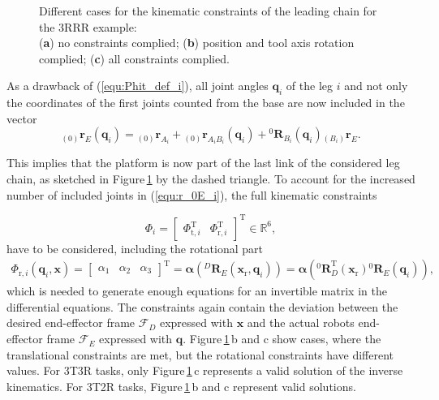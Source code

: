 \documentclass[robotics,article,accept,moreauthors,pdftex]{Definitions/mdpi}
\newcommand{\bm}[1]{\boldsymbol{#1}}
\newcommand{\ortvek}[4]{{ }_{(#1)}{\boldsymbol{#2}}^{#3}_{#4} }
\newcommand{\rotmat}[2]{{{ }^{#1}\boldsymbol{R}}_{#2}}
\newcommand{\transp}[0]{{\mathrm{T}}}
\newcommand{\ks}[1]{{\mathcal{F}}_{#1}}
\let\Phi\varPhi
\begin{document}
\begin{figure}[H]
	
	\caption{Different cases for the kinematic constraints of the leading chain for the 3RRR example:\\(\textbf{a}) no constraints complied; (\textbf{b}) position and tool axis rotation complied; (\textbf{c}) all constraints complied.}
	\label{fig:pkm_constr_rot_lead}
\end{figure} 

As a drawback of (\ref{equ:Phit_def_i}), all joint angles $\bm{q}_i$ of the leg $i$ and not only the coordinates of the first joints counted from the base are now included in the vector
%
\begin{equation}
\ortvek{0}{r}{}{E}(\bm{q}_i) = 
\ortvek{0}{r}{}{A_i}
+ \ortvek{0}{r}{}{A_iB_i}(\bm{q}_i) + \rotmat{0}{B_i}(\bm{q}_i) \ortvek{B_i}{r}{}{E}.
\label{equ:r_0E_i}
\end{equation}
%

This implies that the platform is now part of the last link of the considered leg chain, as sketched in Figure\,\ref{fig:pkm_constr_rot_lead} by the dashed triangle.
To account for the increased number of included joints in (\ref{equ:r_0E_i}), the full kinematic constraints
\vspace{-0.2cm} %

\begin{equation}
\bm{\Phi}_i=\begin{bmatrix}
\bm{\Phi}_{\mathrm{t},i}^\transp & \bm{\Phi}_{\mathrm{r},i}^\transp
\end{bmatrix}^\transp \in {\mathbb{R}}^{6},
\label{equ:Phi_def}
\end{equation}
%
have to be considered, including the rotational part
%
\begin{align}
\bm{\Phi}_{\mathrm{r},i}(\bm{q}_i,\bm{x})
=
\begin{bmatrix}
\alpha_1 & \alpha_2 & \alpha_3
\end{bmatrix}^\transp
=
\bm{\alpha}\left(\rotmat{D}{E}(\bm{x}_{\mathrm{r}},\bm{q}_i)\right)
=
\bm{\alpha}\left(\rotmat{0}{D}^\transp (\bm{x}_{\mathrm{r}})\rotmat{0}{E}(\bm{q}_i)\right),
\label{equ:Phir_def_i}
\end{align}
%
which is needed to generate enough equations for an invertible matrix in the differential equations.
The constraints again contain the deviation between the desired end-effector frame $\ks{D}$ expressed with $\bm{x}$ and the actual robots end-effector frame $\ks{E}$ expressed with $\bm{q}$.
Figure\,\ref{fig:pkm_constr_rot_lead}\,b and c show cases, where the translational constraints are met, but the rotational constraints have different values.
For 3T3R tasks, only Figure\,\ref{fig:pkm_constr_rot_lead}\,c represents a valid solution of the inverse kinematics. For 3T2R tasks, \linebreak Figure\,\ref{fig:pkm_constr_rot_lead}\,b and c represent valid solutions.
\end{document}
